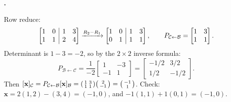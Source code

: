 \documentclass[10pt]{scrartcl}
\makeatletter
\newcommand{\aug}[2]{\left[\begin{array}{@{}#1@{}}#2\end{array}\right]}
\newcommand{\vv}[1]{\mathbf{#1}}
\makeatother
\begin{document}
\begin{prob}\textbf{.}\par{}
\begin{steps}
  \ii Row reduce:
  \[
    \aug{cc|cc}{1&0&1&3\\1&1&2&4}
    \xrightarrow{R_2-R_1}
    \aug{cc|cc}{1&0&1&3\\0&1&1&1},
    \qquad
    P_{\mathcal C\leftarrow\mathcal B}=\begin{bmatrix}1&3\\1&1\end{bmatrix}.
  \]
  \ii Determinant is $1-3=-2$, so by the $2\times 2$ inverse formula:
  \[
    P_{\mathcal B\leftarrow\mathcal C}=\frac{1}{-2}\begin{bmatrix}1&-3\\-1&1\end{bmatrix}=\begin{bmatrix}-1/2&3/2\\1/2&-1/2\end{bmatrix}.
  \]
  \ii Then $[\vv x]_{\mathcal C}=P_{\mathcal C\leftarrow\mathcal B}[\vv x]_{\mathcal B}=\begin{psmallmatrix}1&3\\1&1\end{psmallmatrix}\begin{psmallmatrix}2\\-1\end{psmallmatrix}=\begin{psmallmatrix}-1\\1\end{psmallmatrix}$.
  \ii Check: $\vv x=2(1,2)-(3,4)=(-1,0)$, and $-1(1,1)+1(0,1)=(-1,0)$.
\end{steps}
\end{prob}
\end{document}
